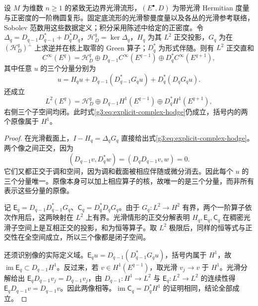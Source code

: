 \begin{theorem}\label{g3:thm:elliptic-complex-hodge-decomposition}
	设 \(M\) 为维数 \(n\ge1\) 的紧致无边界光滑流形，\((E^\bullet,D)\) 为带光滑 Hermitian 度量与正密度的一阶椭圆复形。固定底流形的光滑黎曼度量以及各丛的光滑参考联络，Sobolev 范数用这些数据定义；积分采用陈述中给定的正密度。令 \(\Delta_q=D_{q-1}D_{q-1}^*+D_q^*D_q\)，\(\mathcal H_D^q=\ker\Delta_q\)，\(H_q\) 为其 \(L^2\) 正交投影，\(G_q\) 为在 \((\mathcal H_D^q)^\perp\) 上求逆并在核上取零的 Green 算子；\(D_q^*\) 为形式伴随。则有 \(L^2\) 正交直和
	\begin{equation}\label{g3:eq:smooth-complex-hodge}
		C^\infty(E^q)=\mathcal H_D^q
		\oplus D_{q-1}C^\infty(E^{q-1})
		\oplus D_q^*C^\infty(E^{q+1}),
	\end{equation}
	其中任意 \(u\) 的三个分量分别为
	\begin{equation}\label{g3:eq:explicit-complex-hodge}
		u=H_qu+D_{q-1}(D_{q-1}^*G_qu)+D_q^*(D_qG_qu).
	\end{equation}
	还成立
	\[
		L^2(E^q)=\mathcal H_D^q
		\oplus D_{q-1}H^1(E^{q-1})
		\oplus D_q^*H^1(E^{q+1}),
	\]
	右侧三个子空间均闭。此时式\eqref{g3:eq:explicit-complex-hodge}仍成立，括号内的两个原像属于 \(H^1\)。
\end{theorem}
\begin{proof}
	在光滑截面上，\(I-H_q=\Delta_qG_q\) 直接给出式\eqref{g3:eq:explicit-complex-hodge}。两个像之间正交，因为
	\[
		(D_{q-1}v,D_q^*w)=(D_qD_{q-1}v,w)=0.
	\]
	它们又都正交于调和空间，因为调和截面被相应伴随或微分消去。因此每个 \(u\) 的三个分量唯一。原像本身可以加上相应算子的核，故唯一的是三个分量，而非所有表示这些分量的原像。

	记 \(\mathsf E_q=D_{q-1}D_{q-1}^*G_q\)、\(\mathsf C_q=D_q^*D_qG_q\)。由于 \(G_q:L^2\to H^2\) 有界，两个一阶算子依次作用后，这两映射在 \(L^2\) 上有界。光滑情形的正交分解表明 \(H_q,\mathsf E_q,\mathsf C_q\) 在稠密光滑子空间上是互相正交的投影，和为恒等算子。取 \(L^2\) 极限后，同样的恒等式与正交性在全空间成立，所以三个像都是闭子空间。

	还须识别像的实际定义域。\(\mathsf E_qu=D_{q-1}(D_{q-1}^*G_qu)\)，括号内属于 \(H^1\)，故 \(\operatorname{im}\mathsf E_q\subset D_{q-1}H^1\)。反过来，若 \(v\in H^1(E^{q-1})\)，取光滑 \(v_j\to v\) 于 \(H^1\)。光滑分解给出 \(\mathsf E_qD_{q-1}v_j=D_{q-1}v_j\)，由 \(D_{q-1}:H^1\to L^2\) 与 \(\mathsf E_q:L^2\to L^2\) 的连续性得 \(\mathsf E_qD_{q-1}v=D_{q-1}v\)。因此两像相等。\(\operatorname{im}\mathsf C_q=D_q^*H^1\) 的证明相同，结论全部成立。
\end{proof}

